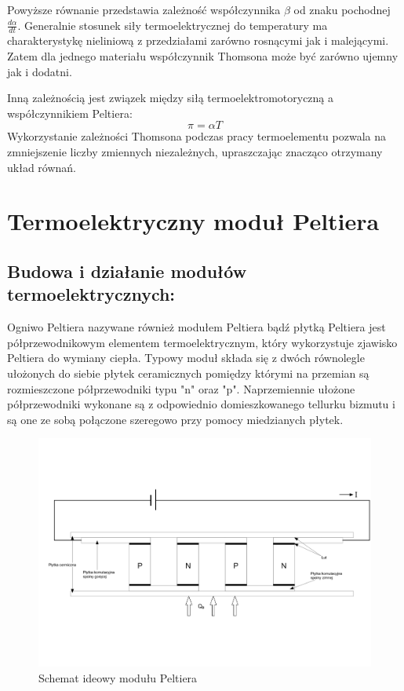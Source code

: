 \documentclass[oneside]{mgr}
\begin{document}
Powyższe równanie przedstawia zależność współczynnika $\beta$ od znaku pochodnej $\frac{d\alpha}{dt}$. Generalnie stosunek siły termoelektrycznej do temperatury ma charakterystykę nieliniową z przedziałami zarówno rosnącymi jak i malejącymi. Zatem dla jednego materiału współczynnik Thomsona może być zarówno ujemny jak i dodatni.

Inną zależnością jest związek między siłą termoelektromotoryczną a współczynnikiem Peltiera:
\begin{equation}
    \pi = \alpha T
\end{equation}
Wykorzystanie zależności Thomsona podczas pracy termoelementu pozwala na zmniejszenie liczby zmiennych niezależnych, upraszczając znacząco otrzymany układ równań. 

\section{Termoelektryczny moduł Peltiera}
\subsection{Budowa i działanie modułów termoelektrycznych:}
Ogniwo Peltiera nazywane również modułem Peltiera bądź płytką Peltiera jest półprzewodnikowym elementem termoelektrycznym, który wykorzystuje zjawisko Peltiera do wymiany ciepła. Typowy moduł składa się z dwóch równolegle ułożonych do siebie płytek ceramicznych pomiędzy którymi na przemian są rozmieszczone półprzewodniki typu "n" oraz "p". Naprzemiennie ułożone półprzewodniki wykonane są z odpowiednio domieszkowanego tellurku bizmutu i są one ze sobą połączone szeregowo przy pomocy miedzianych płytek.

\begin{figure}[h]
    \centering
    \includegraphics[width=\textwidth]{modul_peltiera.jpg}
    \caption{Schemat ideowy modułu Peltiera}
\end{figure}
\end{document}
